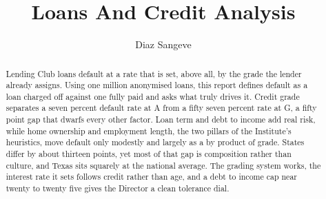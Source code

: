 \documentclass[11pt,preprint]{elsarticle}
\numberwithin{equation}{section}
\numberwithin{figure}{section}
\numberwithin{table}{section}
\begin{document}
\begin{frontmatter}  %

\title{Loans And Credit Analysis}





\author[Add1]{Diaz Sangeve}





\address[Add1]{Stellenbosch University, Stellenbosch, South Africa}


\begin{abstract}
\small{
Lending Club loans default at a rate that is set, above all, by the
grade the lender already assigns. Using one million anonymised loans,
this report defines default as a loan charged off against one fully paid
and asks what truly drives it. Credit grade separates a seven percent
default rate at A from a fifty seven percent rate at G, a fifty point
gap that dwarfs every other factor. Loan term and debt to income add
real risk, while home ownership and employment length, the two pillars
of the Institute's heuristics, move default only modestly and largely as
a by product of grade. States differ by about thirteen points, yet most
of that gap is composition rather than culture, and Texas sits squarely
at the national average. The grading system works, the interest rate it
sets follows credit rather than age, and a debt to income cap near
twenty to twenty five gives the Director a clean tolerance dial.
}
\end{abstract}

\vspace{1cm}





\vspace{0.5cm}

\end{frontmatter}

\setcounter{footnote}{0}


\renewcommand{\contentsname}{Table of Contents}
{\tableofcontents}

\pagestyle{fancy}
\chead{}
\rhead{}
\lfoot{}
\lhead{}
\cfoot{}

\end{document}
